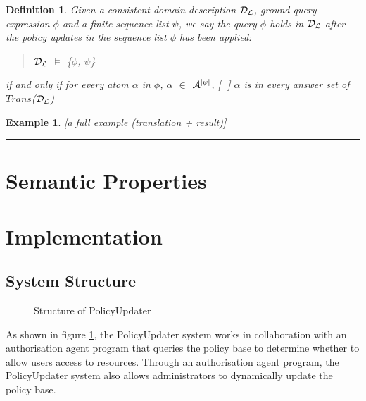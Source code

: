 \documentclass[10pt, twocolumn]{article}
\newtheorem{definition}{Definition}
\newtheorem{examp}{Example}
\newenvironment{example}{\begin{examp}\rm}{\rule{2mm}{2mm}\end{examp}}
\begin{document}
        \begin{definition}
          Given a consistent domain description ${\cal D}_{\cal L}$, ground
          query expression $\phi$ and a finite sequence list $\psi$, we say the
          query $\phi$ holds in ${\cal D}_{\cal L}$ after the policy updates
          in the sequence list $\phi$ has been applied:

          \begin{quote}
            ${\cal D}_{\cal L}$ $\models$ \{$\phi$, $\psi$\}
          \end{quote}

          \noindent if and only if for every atom $\alpha$ in $\phi$, $\alpha$
          $\in$ ${\cal A}^{|\psi|}$, [$\lnot$] $\alpha$ is in every answer
          set of $Trans$(${\cal D}_{\cal L}$)
        \end{definition}

    \begin{example}
      [a full example (translation + result)]

    \end{example}

  \section{Semantic Properties}

  \section{Implementation}

    \subsection{System Structure}

    \begin{figure}[ht]
      \begin{center}
        \caption{Structure of PolicyUpdater}
        \label{fig-1}
      \end{center}
    \end{figure}

      As shown in figure \ref{fig-1}, the PolicyUpdater system works in
      collaboration with an authorisation agent program that queries the
      policy base to determine whether to allow users access to resources.
      Through an authorisation agent program, the PolicyUpdater system also
      allows administrators to dynamically update the policy base.
\end{document}
